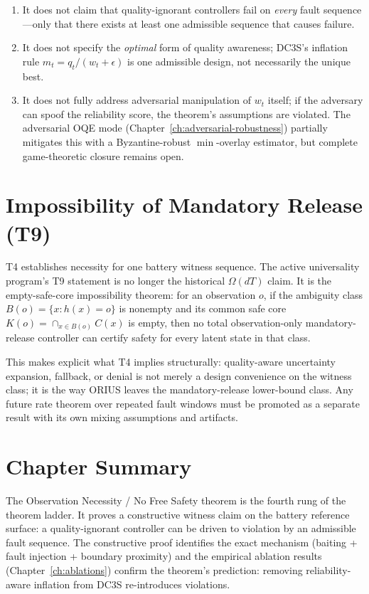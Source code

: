 \begin{enumerate}
  \item It does not claim that quality-ignorant controllers fail on
    \emph{every} fault sequence---only that there exists at least one
    admissible sequence that causes failure.
  \item It does not specify the \emph{optimal} form of quality awareness;
    DC3S's inflation rule $m_t = q_t/(w_t + \epsilon)$ is one
    admissible design, not necessarily the unique best.
  \item It does not fully address adversarial manipulation of $w_t$ itself;
    if the adversary can spoof the reliability score, the theorem's
    assumptions are violated.  The adversarial OQE mode
    (Chapter~\ref{ch:adversarial-robustness}) partially mitigates this
    with a Byzantine-robust $\min$-overlay estimator, but complete
    game-theoretic closure remains open.
\end{enumerate}

\section{Impossibility of Mandatory Release (T9)}
\label{sec:t9-ch19}

T4 establishes necessity for one battery witness sequence.  The active
universality program's T9 statement is no longer the historical
\(\Omega(dT)\) claim.  It is the empty-safe-core impossibility theorem: for an
observation \(o\), if the ambiguity class \(B(o)=\{x:h(x)=o\}\) is nonempty and
its common safe core \(K(o)=\cap_{x\in B(o)}C(x)\) is empty, then no total
observation-only mandatory-release controller can certify safety for every
latent state in that class.

This makes explicit what T4 implies structurally: quality-aware uncertainty
expansion, fallback, or denial is not merely a design convenience on the
witness class; it is the way ORIUS leaves the mandatory-release lower-bound
class.  Any future rate theorem over repeated fault windows must be promoted as
a separate result with its own mixing assumptions and artifacts.

\section{Chapter Summary}

The Observation Necessity / No Free Safety theorem is the fourth rung of the theorem ladder.
It proves a constructive witness claim on the battery reference surface:
a quality-ignorant controller can be driven to violation by an admissible
fault sequence.  The constructive proof
identifies the exact mechanism (baiting + fault injection + boundary
proximity) and the empirical ablation results
(Chapter~\ref{ch:ablations}) confirm the theorem's prediction: removing
reliability-aware inflation from DC3S re-introduces violations.

\begingroup
\def\domainblockid{t4}
\def\domainblocktitle{T4}
\endgroup

